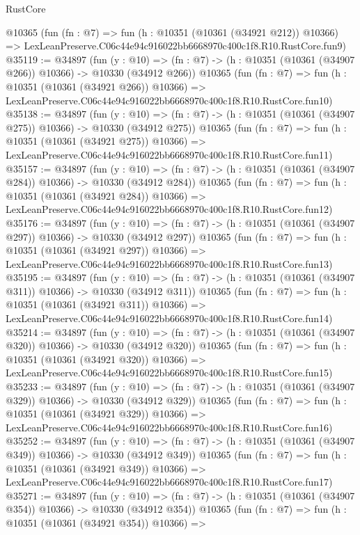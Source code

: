 \begin{lexlean}{RustCore}
\begin{coremodule}
    @10365
    (fun (fn : @7) =>
    fun (h : @10351 (@10361 (@34921 @212)) @10366) =>
    LexLeanPreserve.C06c44e94c916022bb6668970c400c1f8.R10.RustCore.fun9)
@35119 := @34897
    (fun (y : @10) =>
    (fn : @7) -> (h : @10351 (@10361 (@34907 @266)) @10366) -> @10330 (@34912 @266))
    @10365
    (fun (fn : @7) =>
    fun (h : @10351 (@10361 (@34921 @266)) @10366) =>
    LexLeanPreserve.C06c44e94c916022bb6668970c400c1f8.R10.RustCore.fun10)
@35138 := @34897
    (fun (y : @10) =>
    (fn : @7) -> (h : @10351 (@10361 (@34907 @275)) @10366) -> @10330 (@34912 @275))
    @10365
    (fun (fn : @7) =>
    fun (h : @10351 (@10361 (@34921 @275)) @10366) =>
    LexLeanPreserve.C06c44e94c916022bb6668970c400c1f8.R10.RustCore.fun11)
@35157 := @34897
    (fun (y : @10) =>
    (fn : @7) -> (h : @10351 (@10361 (@34907 @284)) @10366) -> @10330 (@34912 @284))
    @10365
    (fun (fn : @7) =>
    fun (h : @10351 (@10361 (@34921 @284)) @10366) =>
    LexLeanPreserve.C06c44e94c916022bb6668970c400c1f8.R10.RustCore.fun12)
@35176 := @34897
    (fun (y : @10) =>
    (fn : @7) -> (h : @10351 (@10361 (@34907 @297)) @10366) -> @10330 (@34912 @297))
    @10365
    (fun (fn : @7) =>
    fun (h : @10351 (@10361 (@34921 @297)) @10366) =>
    LexLeanPreserve.C06c44e94c916022bb6668970c400c1f8.R10.RustCore.fun13)
@35195 := @34897
    (fun (y : @10) =>
    (fn : @7) -> (h : @10351 (@10361 (@34907 @311)) @10366) -> @10330 (@34912 @311))
    @10365
    (fun (fn : @7) =>
    fun (h : @10351 (@10361 (@34921 @311)) @10366) =>
    LexLeanPreserve.C06c44e94c916022bb6668970c400c1f8.R10.RustCore.fun14)
@35214 := @34897
    (fun (y : @10) =>
    (fn : @7) -> (h : @10351 (@10361 (@34907 @320)) @10366) -> @10330 (@34912 @320))
    @10365
    (fun (fn : @7) =>
    fun (h : @10351 (@10361 (@34921 @320)) @10366) =>
    LexLeanPreserve.C06c44e94c916022bb6668970c400c1f8.R10.RustCore.fun15)
@35233 := @34897
    (fun (y : @10) =>
    (fn : @7) -> (h : @10351 (@10361 (@34907 @329)) @10366) -> @10330 (@34912 @329))
    @10365
    (fun (fn : @7) =>
    fun (h : @10351 (@10361 (@34921 @329)) @10366) =>
    LexLeanPreserve.C06c44e94c916022bb6668970c400c1f8.R10.RustCore.fun16)
@35252 := @34897
    (fun (y : @10) =>
    (fn : @7) -> (h : @10351 (@10361 (@34907 @349)) @10366) -> @10330 (@34912 @349))
    @10365
    (fun (fn : @7) =>
    fun (h : @10351 (@10361 (@34921 @349)) @10366) =>
    LexLeanPreserve.C06c44e94c916022bb6668970c400c1f8.R10.RustCore.fun17)
@35271 := @34897
    (fun (y : @10) =>
    (fn : @7) -> (h : @10351 (@10361 (@34907 @354)) @10366) -> @10330 (@34912 @354))
    @10365
    (fun (fn : @7) =>
    fun (h : @10351 (@10361 (@34921 @354)) @10366) =>

\end{coremodule}
\end{lexlean}
